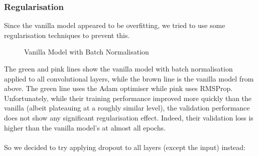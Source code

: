 \documentclass[11pt]{article} %
\theoremstyle{plain}
\theoremstyle{definition}
\begin{document}
\subsubsection{Regularisation}
Since the vanilla model appeared to be overfitting, we tried to use some regularisation techniques to prevent this. 
\begin{figure}[!ht]
\centering
{}
\newline
{}
\caption{Vanilla Model with Batch Normalisation}
\label{fig:vanilla_bn}
\end{figure}
\FloatBarrier
\noindent
The green and pink lines show the vanilla model with batch normalisation applied to all convolutional layers, while the brown line is the vanilla model from above. The green line uses the Adam optimiser while pink uses RMSProp. Unfortunately, while their training performance improved more quickly than the vanilla (albeit plateauing at a roughly similar level), the validation performance does not show any significant regularisation effect. Indeed, their validation loss is higher than the vanilla model's at almost all epochs.
\\
\\
\noindent
So we decided to try applying dropout to all layers (except the input) instead:
\end{document}
